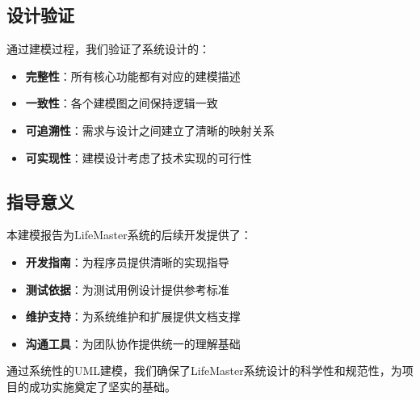 \documentclass[a4paper]{article}
\begin{document}
\subsection{设计验证}

通过建模过程，我们验证了系统设计的：

\begin{itemize}
    \item \textbf{完整性}：所有核心功能都有对应的建模描述
    \item \textbf{一致性}：各个建模图之间保持逻辑一致
    \item \textbf{可追溯性}：需求与设计之间建立了清晰的映射关系
    \item \textbf{可实现性}：建模设计考虑了技术实现的可行性
\end{itemize}

\subsection{指导意义}

本建模报告为LifeMaster系统的后续开发提供了：

\begin{itemize}
    \item \textbf{开发指南}：为程序员提供清晰的实现指导
    \item \textbf{测试依据}：为测试用例设计提供参考标准
    \item \textbf{维护支持}：为系统维护和扩展提供文档支撑
    \item \textbf{沟通工具}：为团队协作提供统一的理解基础
\end{itemize}

通过系统性的UML建模，我们确保了LifeMaster系统设计的科学性和规范性，为项目的成功实施奠定了坚实的基础。

\label{LastPage}
\end{document}
